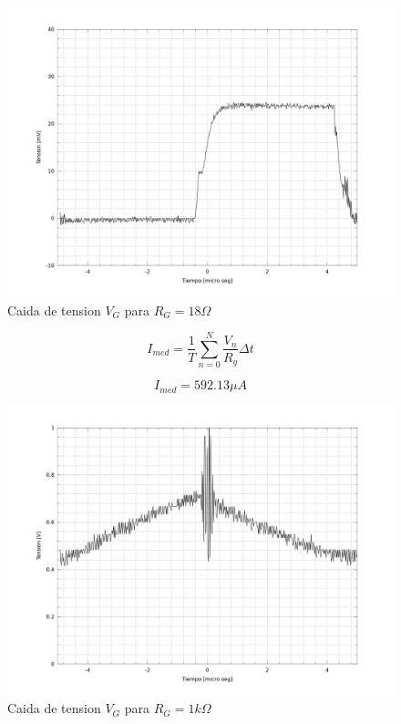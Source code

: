 \documentclass[a4paper,10pt]{article}
\begin{document}
\begin{figure}[H] %
\begin{center}
\includegraphics[scale=0.2]{./imagenes/Vrg1.png}
\caption{Caida de tension $V_ {G}$ para $R_ {G}=18\unit{\Omega}$}
 \label{fig:Corriente_IGBT_18ohm}
\end{center}
\end{figure}

\begin{equation}
I_{med} = \frac{1}{T}\sum_{n=0}^N \frac{V_n}{R_g} \Delta t
\end{equation}

\begin{equation}
	I_{med} = 592.13 \unit{\mu A}
\end{equation}

\begin{figure}[H] %
\begin{center}
\includegraphics[scale=0.2]{./imagenes/Vrg2.png}
\caption{Caida de tension $V_ {G}$ para $R_ {G}=1\unit{k \Omega}$}
 \label{fig:Corriente_IGBT_1kohm}
\end{center}
\end{figure}
\end{document}
